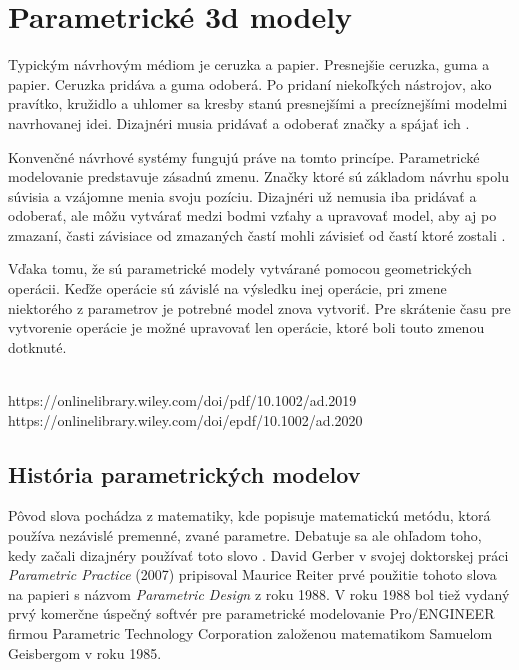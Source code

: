\chapter{Parametrické 3d modely}
Typickým návrhovým médiom je ceruzka a papier. Presnejšie ceruzka, guma a papier. Ceruzka pridáva a guma odoberá. Po pridaní niekoľkých nástrojov, ako pravítko, kružidlo a uhlomer sa kresby stanú presnejšími a precíznejšími modelmi navrhovanej idei. Dizajnéri musia pridávať a odoberať značky a spájať ich \cite{woodbury2010elements}.

Konvenčné návrhové systémy fungujú práve na tomto princípe. Parametrické modelovanie predstavuje zásadnú zmenu. Značky ktoré sú základom návrhu spolu súvisia a vzájomne menia svoju pozíciu. Dizajnéri už nemusia iba pridávať a odoberať, ale môžu vytvárať medzi bodmi vzťahy a upravovať model, aby aj po zmazaní, časti závisiace od zmazaných častí mohli závisieť od častí ktoré zostali \cite{woodbury2010elements}. 

Vďaka tomu, že sú parametrické modely vytvárané pomocou geometrických operácii. Keďže operácie sú závislé na výsledku inej operácie, pri zmene niektorého z parametrov je potrebné model znova vytvoriť. Pre skrátenie času pre vytvorenie operácie je možné upravovať len operácie, ktoré boli touto zmenou dotknuté.


\\
https://onlinelibrary.wiley.com/doi/pdf/10.1002/ad.2019\\
https://onlinelibrary.wiley.com/doi/epdf/10.1002/ad.2020\\





\section{História parametrických modelov}
Pôvod slova  pochádza z matematiky, kde popisuje matematickú metódu, ktorá používa nezávislé premenné, zvané parametre. Debatuje sa ale ohľadom toho, kedy začali dizajnéry používať toto slovo \cite{davis_2013}. David Gerber v svojej doktorskej práci \textit{Parametric Practice} (2007) pripisoval Maurice Reiter prvé použitie tohoto slova na papieri s názvom \textit{Parametric Design} z roku 1988. V roku 1988 bol tiež vydaný prvý komerčne úspečný softvér pre parametrické modelovanie \textsf{Pro/ENGINEER} firmou Parametric Technology Corporation založenou matematikom Samuelom Geisbergom v roku 1985.

